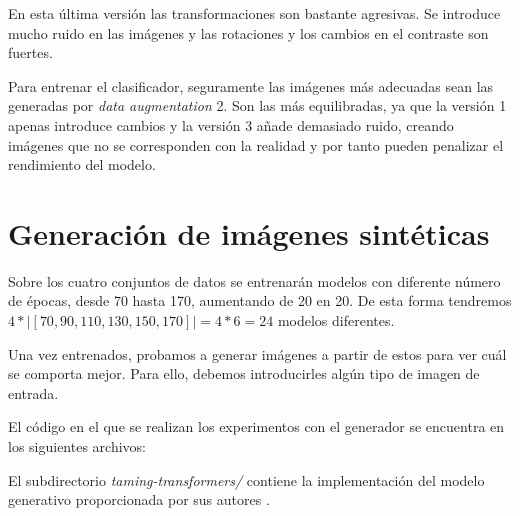 En esta última versión las transformaciones son bastante agresivas. Se introduce mucho ruido en las imágenes y las rotaciones y los cambios en el contraste son fuertes.

Para entrenar el clasificador, seguramente las imágenes más adecuadas sean las generadas por \textit{data augmentation} 2. Son las más equilibradas, ya que la versión 1 apenas introduce cambios y la versión 3 añade demasiado ruido, creando imágenes que no se corresponden con la realidad y por tanto pueden penalizar el rendimiento del modelo.

\newpage
\section{Generación de imágenes sintéticas}

Sobre los cuatro conjuntos de datos se entrenarán modelos con diferente número de épocas, desde 70 hasta 170, aumentando de 20 en 20. De esta forma tendremos $4 * |[70, 90, 110, 130, 150, 170]| = 4 * 6 = 24$ modelos diferentes.

Una vez entrenados, probamos a generar imágenes a partir de estos para ver cuál se comporta mejor. Para ello, debemos introducirles algún tipo de imagen de entrada. 

El código en el que se realizan los experimentos con el generador se encuentra en los siguientes archivos:

\vspace{0.2cm}

\noindent El subdirectorio \textit{taming-transformers/} contiene la implementación del modelo generativo proporcionada por sus autores \cite{taming-transformers-github}. 

